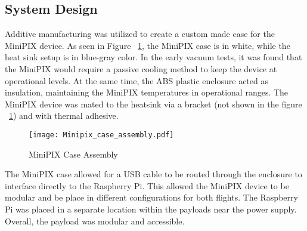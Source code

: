 \subsection{System Design}
Additive manufacturing was utilized to create a custom made case for the MiniPIX device.  As seen in Figure ~\ref{fig:minipix_case}, the MiniPIX case is in white, while the heat sink setup is in blue-gray color.  In the early vacuum tests, it was found that the MiniPIX would require a passive cooling method to keep the device at operational levels.  At the same time, the ABS plastic enclosure acted as insulation, maintaining the MiniPIX temperatures in operational ranges.  The MiniPIX device was mated to the heatsink via a bracket (not shown in the figure ~\ref{fig:minipix_case}) and with thermal adhesive.
\begin{figure}[h]
    \centering
    \texttt{[image: Minipix\_case\_assembly.pdf]}
    \caption{MiniPIX Case Assembly}
    \label{fig:minipix_case}
\end{figure}
The MiniPIX case allowed for a USB cable to be routed through the enclosure to interface directly to the Raspberry Pi.  This allowed the MiniPIX device to be modular and be place in different configurations for both flights.  The Raspberry Pi was placed in a separate location within the payloads near the power supply.  Overall, the payload was modular and accessible.



